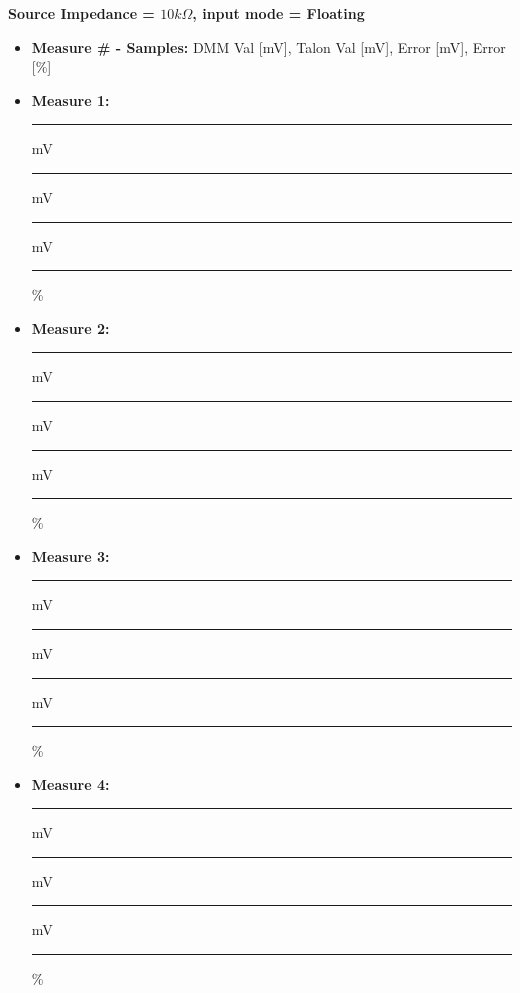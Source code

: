 \textbf{Source Impedance = $10k\Omega$, input mode = Floating}
\begin{itemize}
\item \textbf{Measure \# - Samples:} DMM Val [mV], Talon Val [mV], Error [mV], Error [\%]
\item \textbf{Measure 1:} \rule{1.5cm}{0.15mm} mV \hspace{0.5cm} \rule{1.5cm}{0.15mm} mV \hspace{0.5cm} \rule{1.5cm}{0.15mm} mV \hspace{0.5cm} \rule{1.5cm}{0.15mm} \%
\item \textbf{Measure 2:} \rule{1.5cm}{0.15mm} mV \hspace{0.5cm} \rule{1.5cm}{0.15mm} mV \hspace{0.5cm} \rule{1.5cm}{0.15mm} mV \hspace{0.5cm} \rule{1.5cm}{0.15mm} \%
\item \textbf{Measure 3:} \rule{1.5cm}{0.15mm} mV \hspace{0.5cm} \rule{1.5cm}{0.15mm} mV \hspace{0.5cm} \rule{1.5cm}{0.15mm} mV \hspace{0.5cm} \rule{1.5cm}{0.15mm} \%
\item \textbf{Measure 4:} \rule{1.5cm}{0.15mm} mV \hspace{0.5cm} \rule{1.5cm}{0.15mm} mV \hspace{0.5cm} \rule{1.5cm}{0.15mm} mV \hspace{0.5cm} \rule{1.5cm}{0.15mm} \%
\end{itemize}

